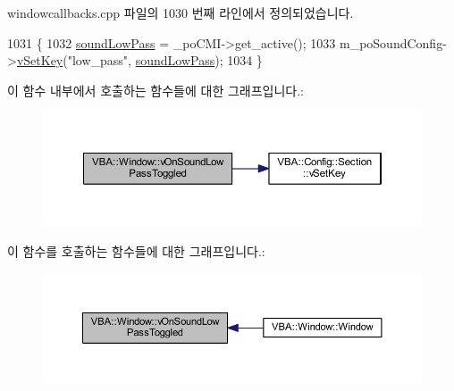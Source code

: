 windowcallbacks.\+cpp 파일의 1030 번째 라인에서 정의되었습니다.


\begin{DoxyCode}
1031 \{
1032   \mbox{\hyperlink{gb_sound_8cpp_aec5149401826955810b6cdef5758badb}{soundLowPass}} = \_poCMI->get\_active();
1033   m\_poSoundConfig->\mbox{\hyperlink{class_v_b_a_1_1_config_1_1_section_a57e1b95cbea40db71c093381beff4b0e}{vSetKey}}(\textcolor{stringliteral}{"low\_pass"}, \mbox{\hyperlink{gb_sound_8cpp_aec5149401826955810b6cdef5758badb}{soundLowPass}});
1034 \}
\end{DoxyCode}
이 함수 내부에서 호출하는 함수들에 대한 그래프입니다.\+:
\nopagebreak
\begin{figure}[H]
\begin{center}
\leavevmode
\includegraphics[width=350pt]{class_v_b_a_1_1_window_a424a694cc0b0e3cb750ed07457b2b11e_cgraph}
\end{center}
\end{figure}
이 함수를 호출하는 함수들에 대한 그래프입니다.\+:
\nopagebreak
\begin{figure}[H]
\begin{center}
\leavevmode
\includegraphics[width=350pt]{class_v_b_a_1_1_window_a424a694cc0b0e3cb750ed07457b2b11e_icgraph}
\end{center}
\end{figure}
\mbox{\label{class_v_b_a_1_1_window_ae0ea496e382a463114dab0895698fed7}} 
